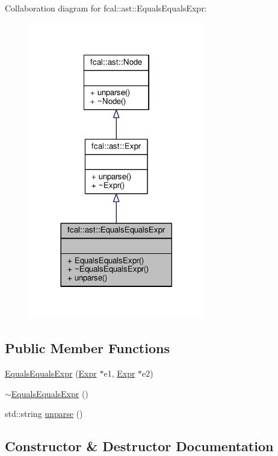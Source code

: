 Collaboration diagram for fcal\+:\+:ast\+:\+:Equals\+Equals\+Expr\+:
\nopagebreak
\begin{figure}[H]
\begin{center}
\leavevmode
\includegraphics[width=218pt]{classfcal_1_1ast_1_1EqualsEqualsExpr__coll__graph}
\end{center}
\end{figure}
\subsection*{Public Member Functions}
\begin{DoxyCompactItemize}
\item 
\hyperlink{classfcal_1_1ast_1_1EqualsEqualsExpr_a2b3efec176a7c9748a7992b0212fd489}{Equals\+Equals\+Expr} (\hyperlink{classfcal_1_1ast_1_1Expr}{Expr} $\ast$e1, \hyperlink{classfcal_1_1ast_1_1Expr}{Expr} $\ast$e2)
\item 
\hyperlink{classfcal_1_1ast_1_1EqualsEqualsExpr_a5c325abf38775a8d4ce8b7176fb3f69e}{$\sim$\+Equals\+Equals\+Expr} ()
\item 
std\+::string \hyperlink{classfcal_1_1ast_1_1EqualsEqualsExpr_a48f3a989601a76e3de580be1d84c7eeb}{unparse} ()
\end{DoxyCompactItemize}


\subsection{Constructor \& Destructor Documentation}
